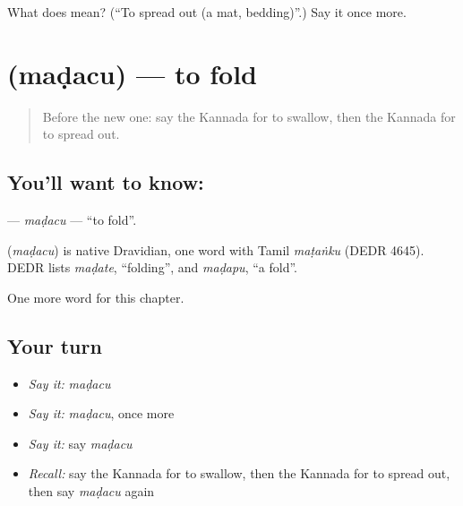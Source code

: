 \begin{tcolorbox}[breakable,colback=teal!4,colframe=teal!35!black,title={Before you move on}]
What does  mean? (\textquotedblleft{}To spread out (a mat, bedding)\textquotedblright{}.) Say it once more.
\end{tcolorbox}
\section[\texorpdfstring{\kn{ಮಡಚು} (maḍacu)}{ಮಡಚು (maḍacu)}]{ (maḍacu) — to fold}

\label{lesson:KA-C199-madacu}



\begin{quote}
Before the new one: say the Kannada for to swallow, then the Kannada for to spread out.
\end{quote}

\subsection*{You'll want to know: }
\textbf{} — \emph{maḍacu} — \textquotedblleft{}to fold\textquotedblright{}.

\begin{cousinweb}
\textbf{} (\emph{maḍacu}) is native Dravidian, one word with Tamil \emph{maṭaṅku} (DEDR 4645). DEDR lists \emph{maḍate}, \textquotedblleft{}folding\textquotedblright{}, and \emph{maḍapu}, \textquotedblleft{}a fold\textquotedblright{}.
\end{cousinweb}

\begin{grammarlens}[title={What you've built}]
One more word for this chapter.
\end{grammarlens}

\subsection*{Your turn}
\begin{itemize}
\raggedright
  \item \emph{Say it:} \emph{maḍacu}
  \item \emph{Say it:} \emph{maḍacu}, once more
  \item \emph{Say it:} say \emph{maḍacu}
  \item \emph{Recall:} say the Kannada for to swallow, then the Kannada for to spread out, then say \emph{maḍacu} again
\end{itemize}

